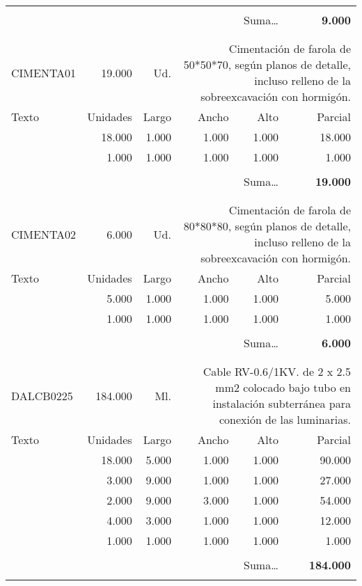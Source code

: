 \documentclass{book}%
\begin{document}
\begin{longtable}{lrrrrr}
&&&&&\\%
\multicolumn{5}{r}{Suma\ldots}&\textbf{9.000}\\%
\hline%
&&&&&\\%
&&&&&\\%
CIMENTA01&19.000& Ud.&\multicolumn{3}{p{6cm}}{\scriptsize Cimentación de farola de 50*50*70, según planos de detalle, incluso relleno de la sobreexcavación con hormigón.\normalsize}\\%
Texto&Unidades&Largo&Ancho&Alto&Parcial\\%
\hline%
\multicolumn{1}{p{3.5cm}}{}&18.000&1.000&1.000&1.000&18.000\\%
\multicolumn{1}{p{3.5cm}}{}&1.000&1.000&1.000&1.000&1.000\\%
&&&&&\\%
\multicolumn{5}{r}{Suma\ldots}&\textbf{19.000}\\%
\hline%
&&&&&\\%
&&&&&\\%
CIMENTA02&6.000& Ud.&\multicolumn{3}{p{6cm}}{\scriptsize Cimentación de farola de 80*80*80, según planos de detalle, incluso relleno de la sobreexcavación con hormigón.\normalsize}\\%
Texto&Unidades&Largo&Ancho&Alto&Parcial\\%
\hline%
\multicolumn{1}{p{3.5cm}}{}&5.000&1.000&1.000&1.000&5.000\\%
\multicolumn{1}{p{3.5cm}}{}&1.000&1.000&1.000&1.000&1.000\\%
&&&&&\\%
\multicolumn{5}{r}{Suma\ldots}&\textbf{6.000}\\%
\hline%
&&&&&\\%
&&&&&\\%
DALCB0225&184.000& Ml.&\multicolumn{3}{p{6cm}}{\scriptsize Cable RV-0.6/1KV. de 2 x 2.5 mm2 colocado bajo tubo en instalación subterránea para conexión de las luminarias.\normalsize}\\%
Texto&Unidades&Largo&Ancho&Alto&Parcial\\%
\hline%
\multicolumn{1}{p{3.5cm}}{}&18.000&5.000&1.000&1.000&90.000\\%
\multicolumn{1}{p{3.5cm}}{}&3.000&9.000&1.000&1.000&27.000\\%
\multicolumn{1}{p{3.5cm}}{}&2.000&9.000&3.000&1.000&54.000\\%
\multicolumn{1}{p{3.5cm}}{}&4.000&3.000&1.000&1.000&12.000\\%
\multicolumn{1}{p{3.5cm}}{}&1.000&1.000&1.000&1.000&1.000\\%
&&&&&\\%
\multicolumn{5}{r}{Suma\ldots}&\textbf{184.000}\\%
\hline%
&&&&&\\%
\end{longtable}%
\newpage
\end{document}
